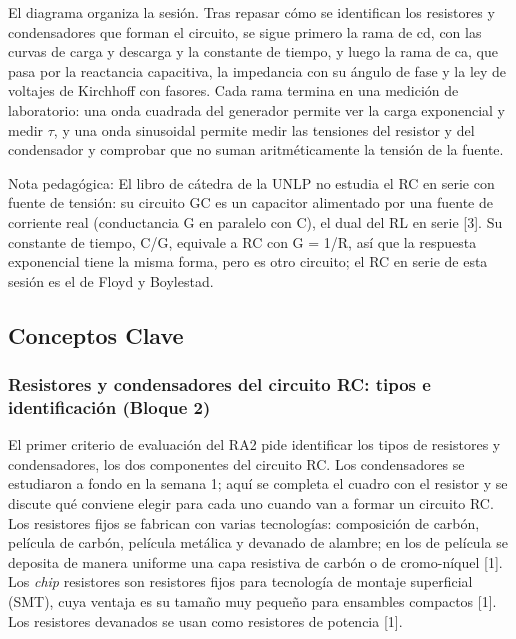 \documentclass[11pt,letterpaper]{article}
\begin{document}
El diagrama organiza la sesión. Tras repasar cómo se identifican los resistores y condensadores que forman el circuito, se sigue primero la rama de cd, con las curvas de carga y descarga y la constante de tiempo, y luego la rama de ca, que pasa por la reactancia capacitiva, la impedancia con su ángulo de fase y la ley de voltajes de Kirchhoff con fasores. Cada rama termina en una medición de laboratorio: una onda cuadrada del generador permite ver la carga exponencial y medir $\tau$, y una onda sinusoidal permite medir las tensiones del resistor y del condensador y comprobar que no suman aritméticamente la tensión de la fuente.

\begin{nota}{Nota pedagógica:}
El libro de cátedra de la UNLP no estudia el RC en serie con fuente de tensión: su circuito \guillemotleft{}GC\guillemotright{} es un capacitor alimentado por una fuente de corriente real (conductancia G en paralelo con C), el dual del RL en serie [3]. Su constante de tiempo, C/G, equivale a RC con G = 1/R, así que la respuesta exponencial tiene la misma forma, pero es otro circuito; el RC en serie de esta sesión es el de Floyd y Boylestad.
\end{nota}

\subsection{Conceptos Clave}

\subsubsection{Resistores y condensadores del circuito RC: tipos e identificación (Bloque 2)}

El primer criterio de evaluación del RA2 pide identificar los tipos de resistores y condensadores, los dos componentes del circuito RC. Los condensadores se estudiaron a fondo en la semana 1; aquí se completa el cuadro con el resistor y se discute qué conviene elegir para cada uno cuando van a formar un circuito RC. Los resistores fijos se fabrican con varias tecnologías: composición de carbón, película de carbón, película metálica y devanado de alambre; en los de película se deposita de manera uniforme una capa resistiva de carbón o de cromo-níquel [1]. Los \textit{chip} resistores son resistores fijos para tecnología de montaje superficial (SMT), cuya ventaja es su tamaño muy pequeño para ensambles compactos [1]. Los resistores devanados se usan como resistores de potencia [1].
\end{document}
